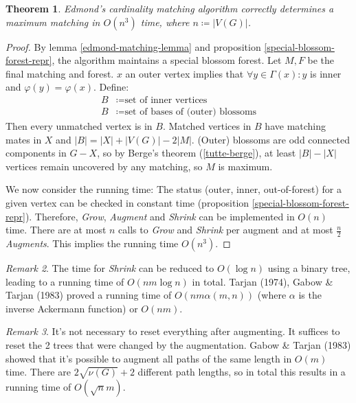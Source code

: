 \documentclass[11pt, a4paper]{article}
\newcommand{\abs}[1]{\left\lvert#1\right\rvert}
\newtheorem{theorem}{Theorem}[section]
\theoremstyle{remark}
\newtheorem{remark}[theorem]{Remark}
\theoremstyle{definition}
\begin{document}
\begin{theorem}\label{thm:edmonds-matching-alg}
	Edmond's cardinality matching algorithm correctly determines a maximum
	matching in $O(n^3)$ time, where $n\coloneqq\abs{V(G)}$.
\end{theorem}
\begin{proof}
	By lemma \ref{edmond-matching-lemma} and proposition
	\ref{special-blossom-forest-repr}, the algorithm maintains a special
	blossom forest. Let $M,F$ be the final matching and forest. $x$ an outer
	vertex implies that $\forall y\in\Gamma(x): y$ is inner and $\varphi(y)=\varphi(x)$.
	Define:
	\begin{align*}
		B & \coloneqq \text{set of inner vertices}            \\
		B & \coloneqq \text{set of bases of (outer) blossoms}
	\end{align*}
	Then every unmatched vertex is in $B$. Matched vertices in $B$ have
	matching mates in $X$ and $\abs{B}=\abs{X}+\abs{V(G)}-2\abs{M}$. (Outer)
	blossoms are odd connected components in $G-X$, so by Berge's theorem
	(\ref{tutte-berge}), at least $\abs{B}-\abs{X}$ vertices remain uncovered
	by any matching, so $M$ is maximum.

	We now consider the running time: The status (outer, inner,
	out-of-forest) for a given vertex can be checked in constant time
	(proposition \ref{special-blossom-forest-repr}). Therefore,
	\emph{Grow}, \emph{Augment} and \emph{Shrink} can be implemented in
	$O(n)$ time. There are at most $n$ calls to \emph{Grow} and
	\emph{Shrink} per augment and at most $\frac{n}{2}$ \emph{Augments}.
	This implies the running time $O(n^3)$.
\end{proof}

\begin{remark}
	The time for \emph{Shrink} can be reduced to $O(\log n)$ using a binary
	tree, leading to a running time of $O(nm\log n)$ in total. Tarjan (1974),
	Gabow \& Tarjan (1983) proved a running time of $O(nm\alpha(m,n))$ (where
	$\alpha$ is the inverse Ackermann function) or $O(nm)$.
\end{remark}

\begin{remark}
	It's not necessary to reset everything after augmenting. It suffices to
	reset the 2 trees that were changed by the augmentation. Gabow \& Tarjan
	(1983) showed that it's possible to augment all paths of the same length in
	$O(m)$ time. There are $2\sqrt{\nu(G)}+2$ different path lengths, so
	in total this results in a running time of $O(\sqrt{n}m)$.
\end{remark}
\end{document}
